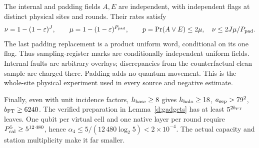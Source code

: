 The internal and padding fields \(A,E\) are independent, with independent flags at distinct physical sites and rounds. Their rates satisfy
\[
 \nu=1-(1-\varepsilon)^J,\qquad
 \mu=1-(1-\varepsilon)^{P_{\rm pad}},\qquad
 p=\Pr(A\lor E)\le2\mu,\quad
 \nu\le2J\mu/P_{\rm pad}.
\]
The last padding replacement is a product uniform word, conditional
on its one flag. Thus sampling-register marks are conditionally independent
uniform fields. Internal faults are arbitrary overlays; discrepancies
from the counterfactual clean sample are charged there. Padding adds
no quantum movement. This is the whole-site physical experiment used
in every source and negative estimate.

Finally, even with unit incidence factors, \(h_{\rm base}\ge8\) gives
\(h_{\rm halo}\ge18\), \(a_{\rm sep}>79^2\), \(b_{\rm FT}\ge6240\).
The verified preparation in Lemma~\ref{d:gadgets} has at least
\(5^{2b_{\rm FT}}\) leaves. One qubit per virtual cell and one native
layer per round require \(P_{\rm cal}^5\ge5^{12\,480}\), hence
\(\alpha_4\le5/(12\,480\log_2 5)<2\times10^{-4}\).
The actual capacity and station multiplicity make it far smaller.

